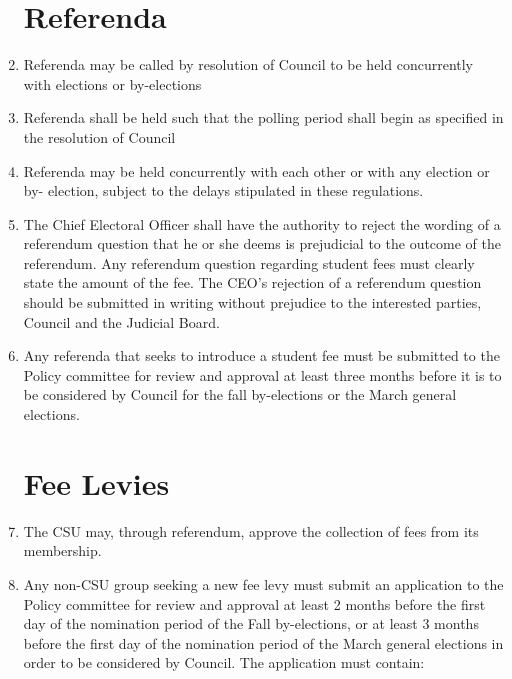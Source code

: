 \documentclass[oneside]{book}
\begin{document}
\begin{enumerate}
\section{\label{Referenda}Referenda }
\item Referenda may be called by resolution of Council to be held concurrently
with elections or by-elections 
\item Referenda shall be held such that the polling period shall begin as
specified in the resolution of Council 
\item Referenda may be held concurrently with each other or with any election
or by- election, subject to the delays stipulated in these regulations. 
\item The Chief Electoral Officer shall have the authority to reject the
wording of a referendum question that he or she deems is prejudicial
to the outcome of the referendum. Any referendum question regarding
student fees must clearly state the amount of the fee. The CEO's rejection
of a referendum question should be submitted in writing without prejudice
to the interested parties, Council and the Judicial Board. 
\item Any referenda that seeks to introduce a student fee must be submitted
to the Policy committee for review and approval at
least three months before it is to be considered by Council for the
fall by-elections or the March general elections. 

\section{\label{Fee_Levies}Fee Levies }
\item The CSU may, through referendum, approve the collection of fees from
its membership. 
\item Any non-CSU group seeking a new fee levy must submit an application
to the Policy committee for review and approval at least 2 months
before the first day of the nomination period of the Fall by-elections,
or at least 3 months before the first day of the nomination period
of the March general elections in order to be considered by Council.
The application must contain: 


\end{enumerate}
\end{document}
